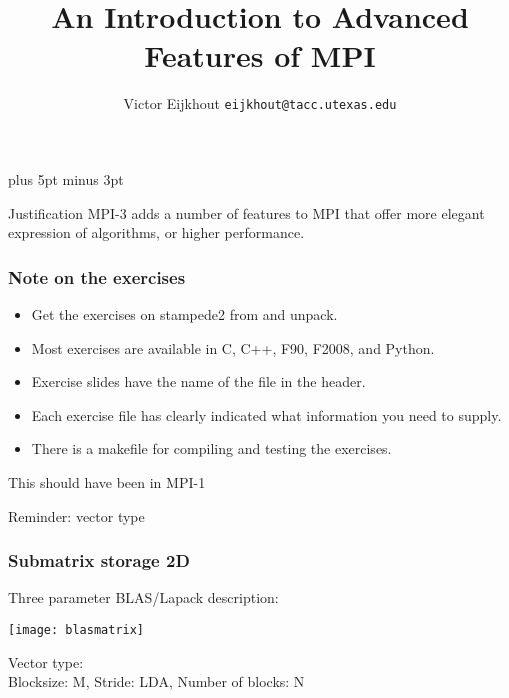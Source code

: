 \documentclass[11pt,headernav]{beamer}
\def\Location{}%
\begin{document}
\parskip=10pt plus 5pt minus 3pt

\title{An Introduction to Advanced Features of MPI}
\author{Victor Eijkhout {\tt eijkhout@tacc.utexas.edu}}
\date{\Location}

\begin{frame}
  \titlepage
\end{frame}

\begin{frame}{Justification}
  MPI-3 adds a number of features to MPI that offer more elegant
  expression of algorithms, or higher performance.
\end{frame}

\begin{frame}[containsverbatim]\frametitle{Note on the exercises}
  \begin{itemize}
  \item Get the exercises on stampede2 from
     and unpack.
  \item Most exercises are available in C, C++, F90, F2008, and Python.
  \item Exercise slides have the name of the file in the header.
  \item Each exercise file has clearly indicated what information you
    need to supply.
  \item There is a makefile for compiling and testing the exercises.
  \end{itemize}
\end{frame}

 {This should have been in MPI-1}


\begin{frame}[containsverbatim]{Reminder: vector type}
\end{frame}

\begin{frame}[containsverbatim]\frametitle{Submatrix storage 2D}
  Three parameter BLAS/Lapack description:

  \texttt{[image: blasmatrix]}  

  Vector type:\\
  Blocksize: M,  Stride: LDA, Number of blocks: N
\end{frame}
\end{document}
